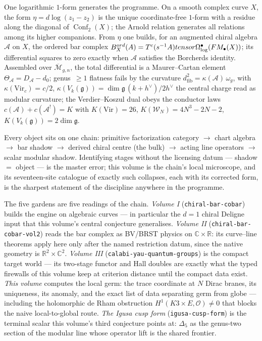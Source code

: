 \documentclass[11pt]{article}
\providecommand{\cA}{\mathcal{A}}
\providecommand{\cO}{\mathcal{O}}
\providecommand{\cW}{\mathcal{W}}
\providecommand{\bC}{\mathbb{C}}
\providecommand{\bR}{\mathbb{R}}
\providecommand{\fg}{\mathfrak{g}}
\providecommand{\barB}{\overline{B}}
\providecommand{\Mbar}{\overline{\mathcal{M}}}
\providecommand{\FM}{\overline{\mathrm{FM}}}
\providecommand{\Vir}{\mathrm{Vir}}
\providecommand{\Dfive}{\Delta_5}
\providecommand{\Conf}{\operatorname{Conf}}
\begin{document}
One logarithmic $1$-form generates the programme. On a smooth complex
curve $X$, the form $\eta=d\log(z_1-z_2)$ is the unique
coordinate-free $1$-form with a residue along the diagonal of
$\Conf_2(X)$; the Arnold relation generates all relations among its
higher companions. From $\eta$ one builds, for an augmented chiral
algebra $\cA$ on $X$, the ordered bar complex
$\barB^{\mathrm{ord}}_X(\cA)=T^c(s^{-1}\bar\cA)\otimes
\Omega^\bullet_{\log}(\FM_\bullet(X))$; its differential squares to
zero exactly when $\cA$ satisfies the Borcherds identity. Assembled
over $\Mbar_{g,n}$, the total differential is a Maurer--Cartan element
$\Theta_\cA=D_\cA-d_0$; genus~$\ge1$ flatness fails by the curvature
$d^2_{\mathrm{fib}}=\kappa(\cA)\,\omega_g$, with
$\kappa(\Vir_c)=c/2$, $\kappa(V_k(\fg))=\dim\fg\,(k+h^\vee)/2h^\vee$
the central charge read as modular curvature; the Verdier--Koszul dual
obeys the conductor laws $c(\cA)+c(\cA^!)=K$ with $K(\Vir)=26$,
$K(\cW_N)=4N^3-2N-2$, $K(V_k(\fg))=2\dim\fg$.

Every object sits on one chain: primitive factorization category
$\to$ chart algebra $\to$ bar shadow $\to$ derived chiral centre
\textup{(the bulk)} $\to$ acting line operators $\to$ scalar modular
shadow. Identifying stages without the licensing datum --- shadow $=$
object --- is the master error; this volume is the chain's local
microscope, and its seventeen-site catalogue of exactly such
collapses, each with its corrected form, is the sharpest statement of
the discipline anywhere in the programme.

The five gardens are five readings of the chain. \emph{Volume I}
(\texttt{chiral-bar-cobar}) builds the engine on algebraic curves ---
in particular the $d=1$ chiral Deligne input that this volume's
central conjecture generalises. \emph{Volume II}
(\texttt{chiral-bar-cobar-vol2}) reads the bar complex as BV/BRST
physics on $\bC\times\bR$: its curve--line theorems apply here only
after the named restriction datum, since the native geometry is
$\bR^2\times\bC^2$. \emph{Volume III}
(\texttt{calabi-yau-quantum-groups}) is the compact target world ---
its two-stage functor and Hall doubles are exactly what the typed
firewalls of this volume keep at criterion distance until the compact
data exist. \emph{This volume} computes the local germ: the trace
coordinate at $N$ Dirac branes, its uniqueness, its anomaly, and the
exact list of data separating germ from globe --- including the
holomorphic de Rham obstruction $H^1(K3\times E,\cO)\neq0$ that
blocks the naive local-to-global route. \emph{The Igusa cusp form}
(\texttt{igusa-cusp-form}) is the terminal scalar this volume's third
conjecture points at: $\Dfive$ as the genus-two section of the
modular line whose operator lift is the shared frontier.
\end{document}
